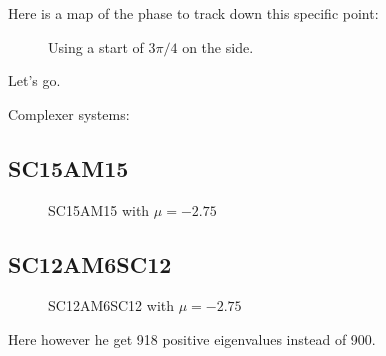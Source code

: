 \documentclass[../main.tex]{subfiles}
\begin{document}
Here is a map of the phase to track down this specific point:
\begin{figure}[H]
    \centering
    
    \caption{Using a start of $3\pi/4$ on the side.}
\end{figure}

Let's go.

Complexer systems:
\subsection{SC15AM15}
\begin{figure}[H]
    \centering
    
    \caption{SC15AM15 with $\mu = -2.75$}
\end{figure}

\subsection{SC12AM6SC12}
\begin{figure}[H]
    \centering
    
    \caption{SC12AM6SC12 with $\mu = -2.75$}
\end{figure}
Here however he get 918 positive eigenvalues instead of 900. 
\end{document}
